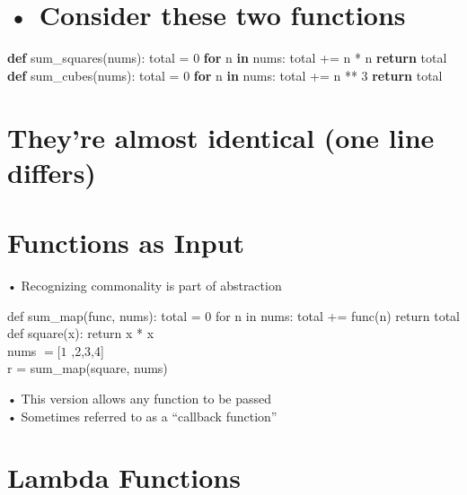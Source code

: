 \documentclass[
  letterpaper,
  DIV=11,
  numbers=noendperiod]{scrreprt}
\newenvironment{Shaded}{\begin{snugshade}}{\end{snugshade}}
\newcommand{\ControlFlowTok}[1]{\textcolor[rgb]{0.00,0.23,0.31}{\textbf{#1}}}
\newcommand{\DecValTok}[1]{\textcolor[rgb]{0.68,0.00,0.00}{#1}}
\newcommand{\KeywordTok}[1]{\textcolor[rgb]{0.00,0.23,0.31}{\textbf{#1}}}
\newcommand{\NormalTok}[1]{\textcolor[rgb]{0.00,0.23,0.31}{#1}}
\newcommand{\OperatorTok}[1]{\textcolor[rgb]{0.37,0.37,0.37}{#1}}
\begin{document}

\chapter{• Consider these two
functions}\label{consider-these-two-functions}

\begin{Shaded}
\begin{Highlighting}[]
\KeywordTok{def}\NormalTok{ sum\_squares(nums):}
\NormalTok{    total }\OperatorTok{=} \DecValTok{0}
    \ControlFlowTok{for}\NormalTok{ n }\KeywordTok{in}\NormalTok{ nums:}
\NormalTok{        total }\OperatorTok{+=}\NormalTok{ n }\OperatorTok{*}\NormalTok{ n}
    \ControlFlowTok{return}\NormalTok{ total}
\KeywordTok{def}\NormalTok{ sum\_cubes(nums):}
\NormalTok{    total }\OperatorTok{=} \DecValTok{0}
    \ControlFlowTok{for}\NormalTok{ n }\KeywordTok{in}\NormalTok{ nums:}
\NormalTok{        total }\OperatorTok{+=}\NormalTok{ n }\OperatorTok{**} \DecValTok{3}
    \ControlFlowTok{return}\NormalTok{ total }
\end{Highlighting}
\end{Shaded}


\chapter{They're almost identical (one line
differs)}\label{theyre-almost-identical-one-line-differs}


\chapter{Functions as Input}\label{functions-as-input-1}

• Recognizing commonality is part of abstraction

def sum\_map(func, nums): total = 0 for n in nums: total += func(n)
return total def square(x): return x * x\\
nums \(= [1\) ,2,3,4{]}\\
r = sum\_map(square, nums)

• This version allows any function to be passed\\
• Sometimes referred to as a ``callback function''


\chapter{Lambda Functions}\label{lambda-functions}
\end{document}
